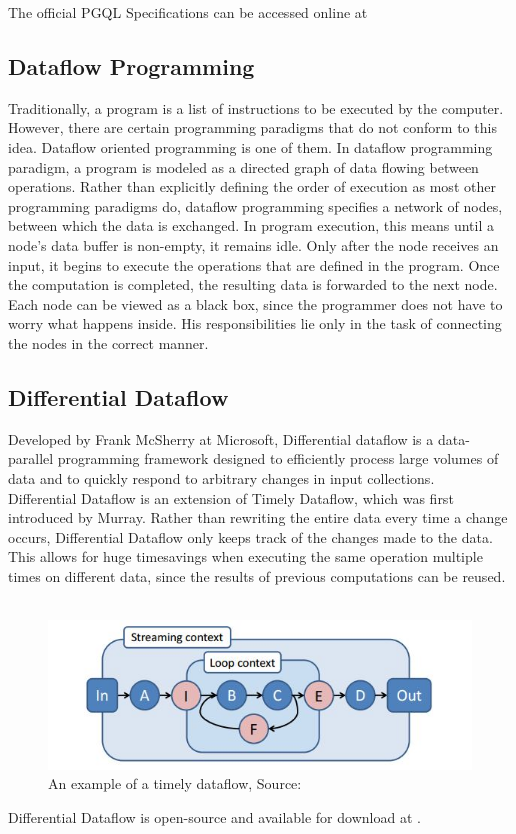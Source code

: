 \documentclass[11pt,singlecolumn]{scrartcl}
\begin{document}
\noindent The official PGQL Specifications can be accessed online at \cite{PGQLSpec}

\subsection{Dataflow Programming}
Traditionally, a program is a list of instructions to be executed by the computer. However, there are certain programming paradigms that do not conform to this idea. Dataflow oriented programming is one of them. In dataflow programming paradigm, a program is modeled as a directed graph of data flowing between operations.  Rather than explicitly defining the order of execution as most other programming paradigms do, dataflow programming specifies a network of nodes, between which the data is exchanged. In program execution, this means until a node's data buffer is non-empty, it remains idle. Only after the node receives an input, it begins to execute the operations that are defined in the program. Once the computation is completed, the resulting data is forwarded to the next node. Each node can be viewed as a black box, since the programmer does not have to worry what happens inside. His responsibilities lie only in the task of connecting the nodes in the correct manner.


\subsection{Differential Dataflow}

Developed by Frank McSherry at Microsoft, Differential dataflow is a data-parallel programming framework designed to efficiently process large volumes of data and to quickly respond to arbitrary changes in input collections.\cite{Differential}\\
Differential Dataflow is an extension of Timely Dataflow, which was first introduced by Murray. \cite{GitTimely}
Rather than rewriting the entire data every time a change occurs, Differential Dataflow only keeps track of the changes made to the data. This allows for huge timesavings when executing the same operation multiple times on different data, since the results of previous computations can be reused.\\\\
\begin{figure}[H]
\includegraphics[width=1\textwidth]{dataflow_example}
\caption{An example of a timely dataflow, Source:\protect\cite{Naiad}}
\end{figure}
Differential Dataflow is open-source and available for download at \cite{GitDiff}.
\end{document}
